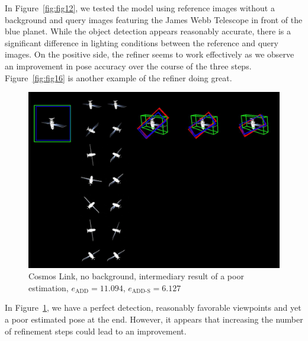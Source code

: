 \bigskip

In Figure~\ref{fig:fig12}, we tested the model using reference images without a background and query images featuring the James Webb Telescope in front of the blue planet. While the object detection appears reasonably accurate, there is a significant difference in lighting conditions between the reference and query images. On the positive side, the refiner seems to work effectively as we observe an improvement in pose accuracy over the course of the three steps. Figure~\ref{fig:fig16} is another example of the refiner doing great.

\bigskip
\cleardoublepage{}

\begin{figure}[ht]
  \centering
  \includegraphics[width=\textwidth]{data/fig13.jpg}
  \caption{Cosmos Link, no background, intermediary result of a poor estimation, $e_\mathrm{ADD}=11.094$, $e_{\mathrm{ADD}\text{-}\mathrm{S}}=6.127$}
  \label{fig:fig13}
\end{figure}

\bigskip

In Figure~\ref{fig:fig13}, we have a perfect detection, reasonably favorable viewpoints and yet a poor estimated pose at the end. However, it appears that increasing the number of refinement steps could lead to an improvement.
\bigskip
\cleardoublepage{}

